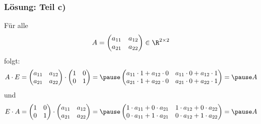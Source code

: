 %
%
\begin{frame}\frametitle{Lösung: Teil c)}
		F\"ur alle
		$$
			A 
			=
			\begin{pmatrix}
				a_{11}	&a_{12}	\\
				a_{21}	&a_{22}
			\end{pmatrix} 
			\in \R^{2\times 2}
		$$
		folgt:
		$$
			A\cdot E 
			=
			\begin{pmatrix}
				a_{11}	&a_{12}	\\
				a_{21}	&a_{22}
			\end{pmatrix} 
			\cdot
			\begin{pmatrix}
				1	&	0\\
				0	&	1
			\end{pmatrix}			
			=\pause
			\begin{pmatrix}
				a_{11}\cdot1+a_{12}\cdot0	&a_{11}\cdot0+a_{12}\cdot1	\\
				a_{21}\cdot1+a_{22}\cdot0	&a_{21}\cdot0+a_{22}\cdot1
			\end{pmatrix} 
			=\pause
			A
		$$
		und\pause
		$$
			E\cdot A 			=
			\begin{pmatrix}
				1	&	0\\
				0	&	1
			\end{pmatrix}
						\cdot	
						\begin{pmatrix}
				a_{11}	&a_{12}	\\
				a_{21}	&a_{22}
			\end{pmatrix} 		
			=\pause
			\begin{pmatrix}
				1\cdot a_{11}+0\cdot a_{21}	&1\cdot a_{12}+0\cdot a_{22}	\\
				0\cdot a_{11}+1\cdot a_{21} &0\cdot a_{12}+1\cdot a_{22}
			\end{pmatrix} 
			=\pause
			A
		$$
\end{frame}
%

